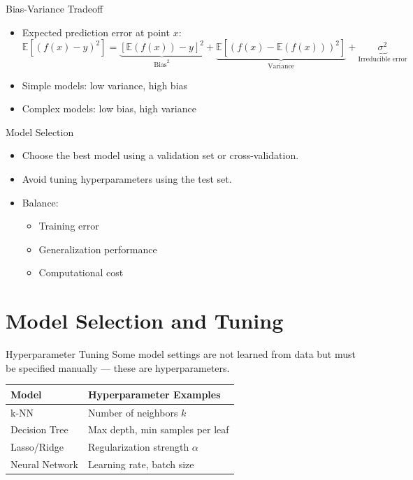 \documentclass[aspectratio=169]{beamer}
\begin{document}
\begin{frame}[label={sec:orgd6bff1e}]{Bias-Variance Tradeoff}
\begin{itemize}
\item Expected prediction error at point \(x\):
\[
  \mathbb{E}[(f(x) - y)^2] = \underbrace{[\mathbb{E}(f(x)) - y]^2}_{\text{Bias}^2} + \underbrace{\mathbb{E}[(f(x) - \mathbb{E}(f(x)))^2]}_{\text{Variance}} + \underbrace{\sigma^2}_{\text{Irreducible error}}
  \]
\item Simple models: low variance, high bias
\item Complex models: low bias, high variance
\end{itemize}
\end{frame}

\begin{frame}[label={sec:org0391ca9}]{Model Selection}
\begin{itemize}
\item Choose the best model using a \alert{validation set} or \alert{cross-validation}.
\item Avoid tuning hyperparameters using the test set.
\item Balance:
\begin{itemize}
\item Training error
\item Generalization performance
\item Computational cost
\end{itemize}
\end{itemize}
\end{frame}

\section{Model Selection and Tuning}
\label{sec:org356eb3d}
\begin{frame}[label={sec:org753ba95}]{Hyperparameter Tuning}
Some model settings are not learned from data but must be specified
manually — these are \alert{hyperparameters}.

\begin{center}
\begin{tabular}{ll}
Model & Hyperparameter Examples\\[0pt]
\hline
k-NN & Number of neighbors \(k\)\\[0pt]
Decision Tree & Max depth, min samples per leaf\\[0pt]
Lasso/Ridge & Regularization strength \(\alpha\)\\[0pt]
Neural Network & Learning rate, batch size\\[0pt]
\end{tabular}
\end{center}
\end{frame}
\end{document}
